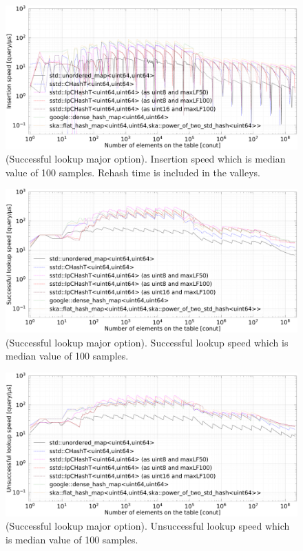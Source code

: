 \begin{figure}[h]
  \hspace{-3mm}
  \includegraphics[scale=0.24]{./fig_bench_sm/insert_med.pdf}
  \caption{
    (Successful lookup major option). Insertion speed which is median value of 100 samples.
    Rehash time is included in the valleys.
  }
  \label{fig_bench_insert_sm}
\end{figure}

\begin{figure}[h]
  \hspace{-3mm}
  \includegraphics[scale=0.24]{./fig_bench_sm/find_successful_lookup_med.pdf}
  \caption{
    (Successful lookup major option). Successful lookup speed which is median value of 100 samples.
  }
  \label{fig_bench_find_s_sm}
\end{figure}

\begin{figure}[h]
  \hspace{-3mm}
  \includegraphics[scale=0.24]{./fig_bench_sm/find_unsuccessful_lookup_med.pdf}
  \caption{
    (Successful lookup major option). Unsuccessful lookup speed which is median value of 100 samples.
  }
  \label{fig_bench_find_us_sm}
\end{figure}

